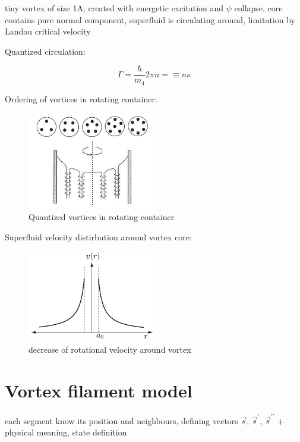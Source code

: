 tiny vortex of size 1A, created with energetic excitation and $\psi$ collapse, core contains pure normal component, superfluid is circulating around, limitation by Landau critical velocity

Quantized circulation:

\begin{equation}
\Gamma = \frac{\hbar}{m_4} 2\pi n = \equiv n \kappa
\label{gamma}
\end{equation}

Ordering of vortices in rotating container:

\begin{figure}[h]
	\centering
	\includegraphics[width=0.5\textwidth]{graphics/theory/rotating-helium}
	\caption{Quantized vortices in rotating container}
	\label{rotating-helium}
\end{figure}

Superfluid velocity distirbution around vortex core:

\begin{figure}[h]
	\centering
	\includegraphics[width=0.5\textwidth]{graphics/theory/vortex_velocity}
	\caption{decrease of rotational velocity around vortex}
	\label{vortex_velocity}
\end{figure}


\section{Vortex filament model}
each segment know its position and neighbours, defining vectors $\vec{s}$, $\vec{s}^{\prime}$, $\vec{s}^{\prime\prime}$ + physical meaning, state definition

